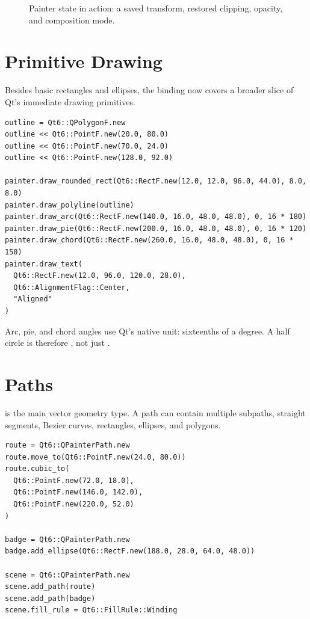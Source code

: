 \begin{figure}[htbp]
  \centering
  \caption{Painter state in action: a saved transform, restored clipping, opacity, and composition mode.}
\end{figure}

\section{Primitive Drawing}

Besides basic rectangles and ellipses, the binding now covers a broader slice of Qt's immediate drawing primitives.

\begin{lstlisting}[style=crystal]
outline = Qt6::QPolygonF.new
outline << Qt6::PointF.new(20.0, 80.0)
outline << Qt6::PointF.new(70.0, 24.0)
outline << Qt6::PointF.new(128.0, 92.0)

painter.draw_rounded_rect(Qt6::RectF.new(12.0, 12.0, 96.0, 44.0), 8.0, 8.0)
painter.draw_polyline(outline)
painter.draw_arc(Qt6::RectF.new(140.0, 16.0, 48.0, 48.0), 0, 16 * 180)
painter.draw_pie(Qt6::RectF.new(200.0, 16.0, 48.0, 48.0), 0, 16 * 120)
painter.draw_chord(Qt6::RectF.new(260.0, 16.0, 48.0, 48.0), 0, 16 * 150)
painter.draw_text(
  Qt6::RectF.new(12.0, 96.0, 120.0, 28.0),
  Qt6::AlignmentFlag::Center,
  "Aligned"
)
\end{lstlisting}

Arc, pie, and chord angles use Qt's native unit: sixteenths of a degree. A half circle is therefore , not just .

\section{Paths}

 is the main vector geometry type. A path can contain multiple subpaths, straight segments, Bezier curves, rectangles, ellipses, and polygons.

\begin{lstlisting}[style=crystal]
route = Qt6::QPainterPath.new
route.move_to(Qt6::PointF.new(24.0, 80.0))
route.cubic_to(
  Qt6::PointF.new(72.0, 18.0),
  Qt6::PointF.new(146.0, 142.0),
  Qt6::PointF.new(220.0, 52.0)
)

badge = Qt6::QPainterPath.new
badge.add_ellipse(Qt6::RectF.new(188.0, 28.0, 64.0, 48.0))

scene = Qt6::QPainterPath.new
scene.add_path(route)
scene.add_path(badge)
scene.fill_rule = Qt6::FillRule::Winding
\end{lstlisting}

